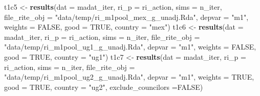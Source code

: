 \documentclass[]{article}
\newenvironment{Shaded}{\begin{snugshade}}{\end{snugshade}}
\newcommand{\KeywordTok}[1]{\textcolor[rgb]{0.13,0.29,0.53}{\textbf{{#1}}}}
\newcommand{\DataTypeTok}[1]{\textcolor[rgb]{0.13,0.29,0.53}{{#1}}}
\newcommand{\StringTok}[1]{\textcolor[rgb]{0.31,0.60,0.02}{{#1}}}
\newcommand{\OtherTok}[1]{\textcolor[rgb]{0.56,0.35,0.01}{{#1}}}
\newcommand{\NormalTok}[1]{{#1}}
\begin{document}
\begin{Shaded}
\begin{Highlighting}[]
  \NormalTok{t1c5 <-}\StringTok{ }\KeywordTok{results}\NormalTok{(}\DataTypeTok{dat =} \NormalTok{madat_iter, }\DataTypeTok{ri_p =} \NormalTok{ri_action, }\DataTypeTok{sims =} \NormalTok{n_iter,}
                  \DataTypeTok{file_rite_obj =} \StringTok{"data/temp/ri_m1pool_mex_g_unadj.Rda"}\NormalTok{,}
                  \DataTypeTok{depvar =} \StringTok{"m1"}\NormalTok{, }\DataTypeTok{weights =} \OtherTok{FALSE}\NormalTok{, }\DataTypeTok{good =} \OtherTok{TRUE}\NormalTok{, }\DataTypeTok{country =} \StringTok{"mex"}\NormalTok{)}
  \NormalTok{t1c6 <-}\StringTok{ }\KeywordTok{results}\NormalTok{(}\DataTypeTok{dat =} \NormalTok{madat_iter, }\DataTypeTok{ri_p =} \NormalTok{ri_action, }\DataTypeTok{sims =} \NormalTok{n_iter,}
                  \DataTypeTok{file_rite_obj =} \StringTok{"data/temp/ri_m1pool_ug1_g_unadj.Rda"}\NormalTok{,}
                  \DataTypeTok{depvar =} \StringTok{"m1"}\NormalTok{, }\DataTypeTok{weights =} \OtherTok{FALSE}\NormalTok{, }\DataTypeTok{good =} \OtherTok{TRUE}\NormalTok{, }\DataTypeTok{country =} \StringTok{"ug1"}\NormalTok{)}
  \NormalTok{t1c7 <-}\StringTok{ }\KeywordTok{results}\NormalTok{(}\DataTypeTok{dat =} \NormalTok{madat_iter, }\DataTypeTok{ri_p =} \NormalTok{ri_action, }\DataTypeTok{sims =} \NormalTok{n_iter,}
                  \DataTypeTok{file_rite_obj =} \StringTok{"data/temp/ri_m1pool_ug2_g_unadj.Rda"}\NormalTok{,}
                  \DataTypeTok{depvar =} \StringTok{"m1"}\NormalTok{, }\DataTypeTok{weights =} \OtherTok{TRUE}\NormalTok{,  }\DataTypeTok{good =} \OtherTok{TRUE}\NormalTok{, }\DataTypeTok{country =} \StringTok{"ug2"}\NormalTok{,}
                  \DataTypeTok{exclude_councilors =}\OtherTok{FALSE}\NormalTok{)}
  

\end{Highlighting}
\end{Shaded}
\end{document}
